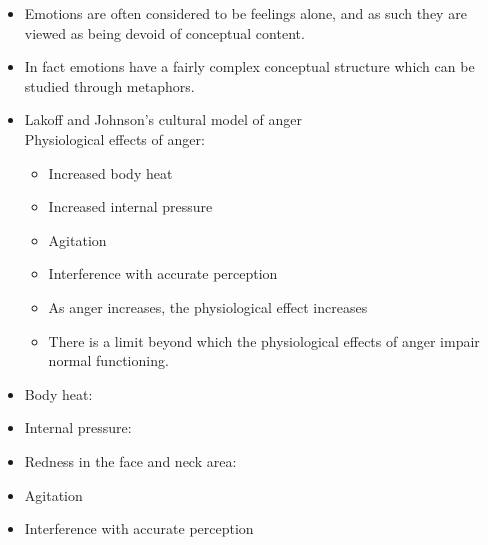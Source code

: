 \documentclass[a4paper,landscape,headrule,footrule,xetex]{foils}
\begin{document}

\begin{itemize}\addtolength{\itemsep}{-1ex}
\item Emotions are often considered to be feelings alone, and
as such they are viewed as being devoid of conceptual
content.
\item In fact emotions have a fairly complex conceptual
structure which can be studied through metaphors.
\item Lakoff and Johnson's cultural model of anger
\\ Physiological effects of anger:
  \begin{itemize}
  \item Increased body heat
  \item Increased internal pressure
  \item Agitation
  \item Interference with accurate perception
  \item As anger increases, the physiological effect increases
  \item There is a limit beyond which the physiological effects of anger impair normal functioning.
\end{itemize}
\end{itemize}

\begin{itemize}
\item Body heat:
  \begin{exe}
    \ex {}
    \ex {}
    \ex {}
    \ex {}
  \end{exe}
  \item Internal pressure:
  \begin{exe}
    \ex {}
    \ex {}
    \ex {}
  \end{exe}
\newpage
\item Redness in the face and neck area:
  \begin{exe}
    \ex {}
    \ex {}
    \ex {}
  \end{exe}
\item Agitation
\begin{exe}
  \ex {}
  \ex {}
  \ex {}
  \ex {}
 \ex {}
\end{exe}
\newpage
\item Interference with accurate perception
\begin{exe}
  \ex {}
  \ex {}
  \ex {}
\end{exe}
\end{itemize}
\end{document}
